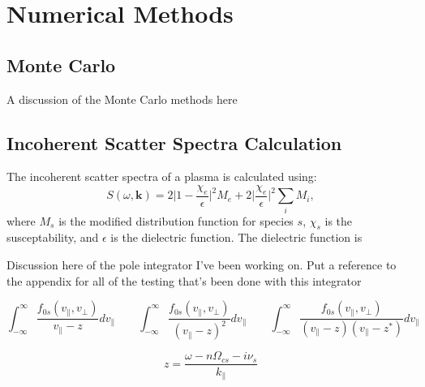 \chapter{Numerical Methods}

\section{Monte Carlo}

A discussion of the Monte Carlo methods here



\section{Incoherent Scatter Spectra Calculation}
The incoherent scatter spectra of a plasma is calculated using: %
\begin{equation}
		S(\omega, \mathbf{k}) = 2 \bigg| 1 - \frac{\chi_e}{\epsilon} \bigg|^2 M_e
						+ 2 \bigg| \frac{\chi_e}{\epsilon} \bigg|^2 \sum_i M_i,
\end{equation}
where $M_s$ is the modified distribution function for species $s$,
$\chi_s$ is the susceptability, 
and $\epsilon$ is the dielectric function. 
The dielectric function is 


Discussion here of the pole integrator I've been working on. 
Put a reference to the appendix for all of the testing that's been done with this integrator


\begin{equation}
	\int_{-\infty}^\infty \frac{f_{0s}(v_\parallel,v_\perp)}{v_\parallel - z} dv_\parallel
	\qquad
	\int_{-\infty}^\infty \frac{f_{0s}(v_\parallel,v_\perp)}{(v_\parallel - z)^2} dv_\parallel
	\qquad
	\int_{-\infty}^\infty \frac{f_{0s}(v_\parallel,v_\perp)}{(v_\parallel - z)(v_\parallel - z^*)} dv_\parallel
\end{equation}

\begin{equation}
	z = \frac{\omega - n\Omega_{cs}- i \nu_s}{k_\parallel}
\end{equation}